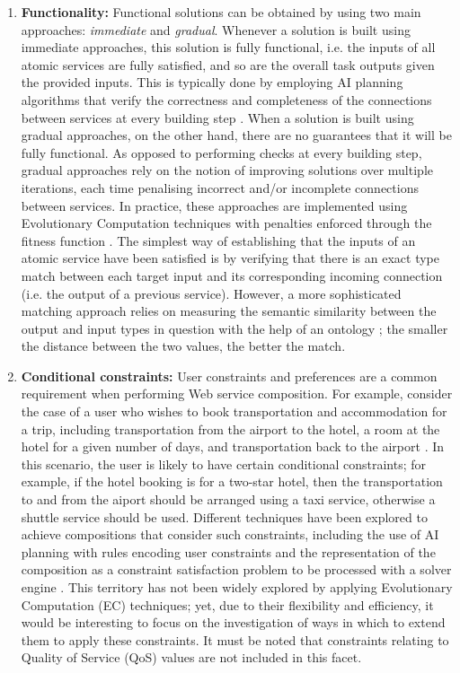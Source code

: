 \begin{enumerate}
 \item \textbf{Functionality:} Functional solutions can be obtained by using two main approaches: \textit{immediate} and \textit{gradual}. Whenever a solution is built using immediate approaches, this solution is fully functional, i.e. the inputs of all atomic services are fully satisfied, and so are the overall task outputs given the provided inputs. This is typically done by employing AI planning algorithms that verify the correctness and completeness of the connections between services at every building step \cite{wang2014automated}. When a solution is built using gradual approaches, on the other hand, there are no guarantees that it will be fully functional. As opposed to performing checks at every building step, gradual approaches rely on the notion of improving solutions over multiple iterations, each time penalising incorrect and/or incomplete connections between services. In practice, these approaches are implemented using Evolutionary Computation techniques with penalties enforced through the fitness function \cite{rodriguez2010composition}. The simplest way of establishing that the inputs of an atomic service have been satisfied is by verifying that there is an exact type match between each target input and its corresponding incoming connection (i.e. the output of a previous service). However, a more sophisticated matching approach relies on measuring the semantic similarity between the output and input types in question with the help of an ontology \cite{DBLP:journals/soca/BoustilMS14}; the smaller the distance between the two values, the better the match.
 
 \item \textbf{Conditional constraints:}  User constraints and preferences are a common requirement when performing Web service composition. For example,
 consider the case of a user who wishes to book transportation and accommodation for a trip, including transportation
 from the airport to the hotel, a room at the hotel for a given number of days, and transportation back
 to the airport \cite{boustil2010web}. In this scenario, the user is likely to have certain conditional constraints; for example, if the hotel booking
 is for a two-star hotel, then the transportation to and from the aiport should be arranged using a taxi service, otherwise a shuttle service should
 be used. Different techniques have been explored to achieve compositions that consider such constraints, including the use of AI planning
 with rules encoding user constraints \cite{DBLP:journals/soca/BoustilMS14} and the representation of the composition
 as a constraint satisfaction problem to be processed with a solver engine \cite{karakoc2009composing}. This
 territory has not been widely explored by applying Evolutionary Computation (EC) techniques; yet, due to their flexibility and efficiency, it would be
 interesting to focus on the investigation of ways in which to extend them to apply these constraints. It must be noted
 that constraints relating to Quality of Service (QoS) values are not included in this facet.
 

\end{enumerate}
